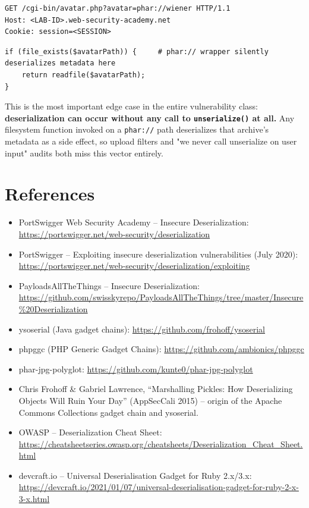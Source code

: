 \documentclass[11pt]{article}
\begin{document}
\begin{lstlisting}[style=http]
GET /cgi-bin/avatar.php?avatar=phar://wiener HTTP/1.1
Host: <LAB-ID>.web-security-academy.net
Cookie: session=<SESSION>
\end{lstlisting}
\begin{causebox}
\begin{lstlisting}[style=code]
if (file_exists($avatarPath)) {     # phar:// wrapper silently deserializes metadata here
    return readfile($avatarPath);
}
\end{lstlisting}
This is the most important edge case in the entire vulnerability class: \textbf{deserialization can occur without any call to \texttt{unserialize()} at all.} Any filesystem function invoked on a \texttt{phar://} path deserializes that archive's metadata as a side effect, so upload filters and "we never call unserialize on user input" audits both miss this vector entirely.
\end{causebox}


\section{References}
\begin{itemize}
    \item PortSwigger Web Security Academy -- Insecure Deserialization: \url{https://portswigger.net/web-security/deserialization}
    \item PortSwigger -- Exploiting insecure deserialization vulnerabilities (July 2020): \url{https://portswigger.net/web-security/deserialization/exploiting}
    \item PayloadsAllTheThings -- Insecure Deserialization: \url{https://github.com/swisskyrepo/PayloadsAllTheThings/tree/master/Insecure%20Deserialization}
    \item ysoserial (Java gadget chains): \url{https://github.com/frohoff/ysoserial}
    \item phpggc (PHP Generic Gadget Chains): \url{https://github.com/ambionics/phpggc}
    \item phar-jpg-polyglot: \url{https://github.com/kunte0/phar-jpg-polyglot}
    \item Chris Frohoff \& Gabriel Lawrence, ``Marshalling Pickles: How Deserializing Objects Will Ruin Your Day'' (AppSecCali 2015) -- origin of the Apache Commons Collections gadget chain and ysoserial.
    \item OWASP -- Deserialization Cheat Sheet: \url{https://cheatsheetseries.owasp.org/cheatsheets/Deserialization_Cheat_Sheet.html}
    \item devcraft.io -- Universal Deserialisation Gadget for Ruby 2.x/3.x: \url{https://devcraft.io/2021/01/07/universal-deserialisation-gadget-for-ruby-2-x-3-x.html}
\end{itemize}
\end{document}
